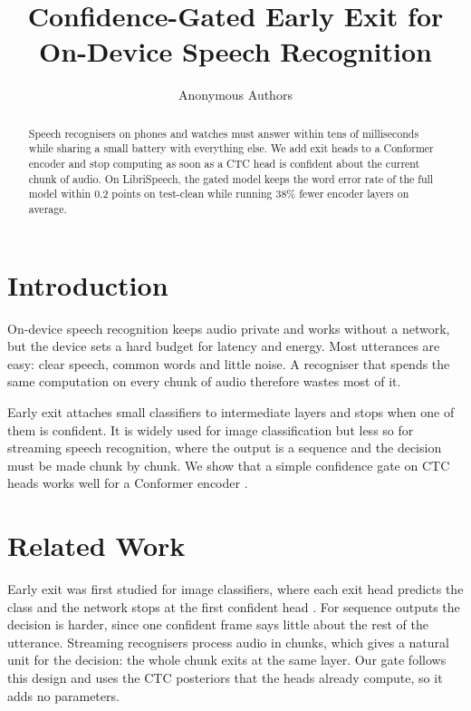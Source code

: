 \documentclass[10pt,twocolumn]{article}
\title{Confidence-Gated Early Exit for On-Device Speech Recognition}
\author{Anonymous Authors}
\date{}
\begin{document}
\maketitle

\begin{abstract}
Speech recognisers on phones and watches must answer within tens of milliseconds while sharing a small battery with everything else.
We add exit heads to a Conformer encoder and stop computing as soon as a CTC head is confident about the current chunk of audio.
On LibriSpeech, the gated model keeps the word error rate of the full model within 0.2 points on test-clean while running 38\% fewer encoder layers on average.
\end{abstract}

\section{Introduction}

On-device speech recognition keeps audio private and works without a network, but the device sets a hard budget for latency and energy.
Most utterances are easy: clear speech, common words and little noise.
A recogniser that spends the same computation on every chunk of audio therefore wastes most of it.

Early exit \citep{teerapittayanon2016branchynet} attaches small classifiers to intermediate layers and stops when one of them is confident.
It is widely used for image classification but less so for streaming speech recognition, where the output is a sequence and the decision must be made chunk by chunk.
We show that a simple confidence gate on CTC heads \citep{graves2006connectionist} works well for a Conformer encoder \citep{gulati2020conformer}.

\section{Related Work}

Early exit was first studied for image classifiers, where each exit head predicts the class and the network stops at the first confident head \citep{teerapittayanon2016branchynet}.
For sequence outputs the decision is harder, since one confident frame says little about the rest of the utterance.
Streaming recognisers process audio in chunks, which gives a natural unit for the decision: the whole chunk exits at the same layer.
Our gate follows this design and uses the CTC posteriors \citep{graves2006connectionist} that the heads already compute, so it adds no parameters.
\end{document}
